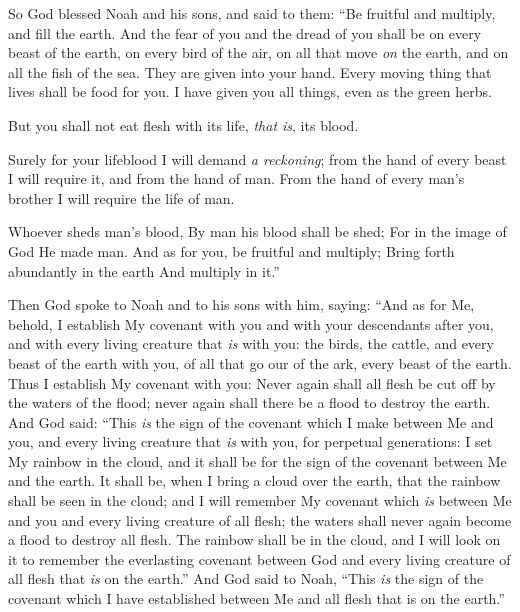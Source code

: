 
\bverse So God blessed Noah and his sons, and said to them: ``Be fruitful and multiply, and fill the earth.
\bverse And the fear of you and the dread of you shall be on every beast of the earth, on every bird of the air, on all that move \textit{on} the earth, and on all the fish of the sea. They are given into your hand.
\bverse Every moving thing that lives shall be food for you. I have given you all things, even as the green herbs.

\bverse But you shall not eat flesh with its life, \textit{that is}, its blood.

\bverse Surely for your lifeblood I will demand \textit{a reckoning}; from the hand of every beast I will require it, and from the hand of man. From the hand of every man's brother I will require the life of man.
\begin{bquotation}
\bverse Whoever sheds man's blood, By man his blood shall be shed; For in the image of God He made man. 
\bverse And as for you, be fruitful and multiply; Bring forth abundantly in the earth And multiply in it.''
\end{bquotation}
\bverse Then God spoke to Noah and to his sons with him, saying:
\bverse ``And as for Me, behold, I establish My covenant with you and with your descendants after you,
\bverse and with every living creature that \textit{is} with you: the birds, the cattle, and every beast of the earth with you, of all that go our of the ark, every beast of the earth.
\bverse Thus I establish My covenant with you: Never again shall all flesh be cut off by the waters of the flood; never again shall there be a flood to destroy the earth.
\bverse And God said: ``This \textit{is} the sign of the covenant which I make between Me and you, and every living creature that \textit{is} with you, for perpetual generations:
\bverse I set My rainbow in the cloud, and it shall be for the sign of the covenant between Me and the earth.
\bverse It shall be, when I bring a cloud over the earth, that the rainbow shall be seen in the cloud;
\bverse and I will remember My covenant which \textit{is} between Me and you and every living creature of all flesh; the waters shall never again become a flood to destroy all flesh.
\bverse The rainbow shall be in the cloud, and I will look on it to remember the everlasting covenant between God and every living creature of all flesh that \textit{is} on the earth.''
\bverse And God said to Noah, ``This \textit{is} the sign of the covenant which I have established between Me and all flesh that is on the earth.''

